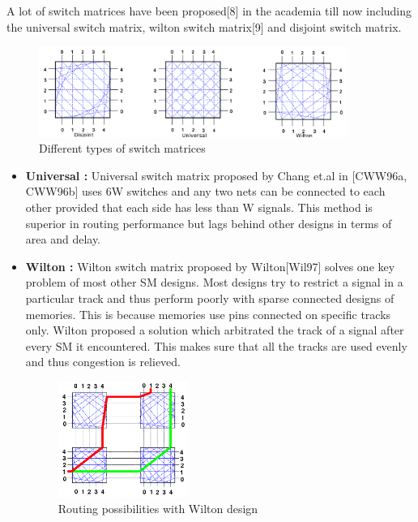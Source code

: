 A lot of switch matrices have been proposed[8] in the academia till now including the universal switch matrix, wilton switch matrix[9] and disjoint switch matrix.
\begin{figure}[H]
\centering
\includegraphics[width=0.9\textwidth]{switchmatrix_types.png}
\caption{Different types of switch matrices}
\label{fig:Figure}
\end{figure}
\begin{itemize}
  \item \textbf{Universal : } Universal switch matrix proposed by Chang et.al in [CWW96a, CWW96b] uses 6W switches and any two nets can be connected to each other provided that each side has less than W signals. This method is superior in routing performance but lags behind other designs in terms of area and delay.

  \item \textbf{Wilton : } Wilton switch matrix proposed by Wilton[Wil97] solves one key problem of most other SM designs. Most designs try to restrict a signal in a particular track and thus perform poorly with sparse connected designs of memories. This is because memories use pins connected on specific tracks only. Wilton proposed a solution which arbitrated the track of a signal after every SM it encountered. This makes sure that all the tracks are used evenly and thus congestion is relieved.
\begin{figure}[H]
\centering
\includegraphics[width=0.4\textwidth]{wilton_possibility.png}
\caption{Routing possibilities with Wilton design}
\label{fig:Figure}
\end{figure}


\end{itemize}
